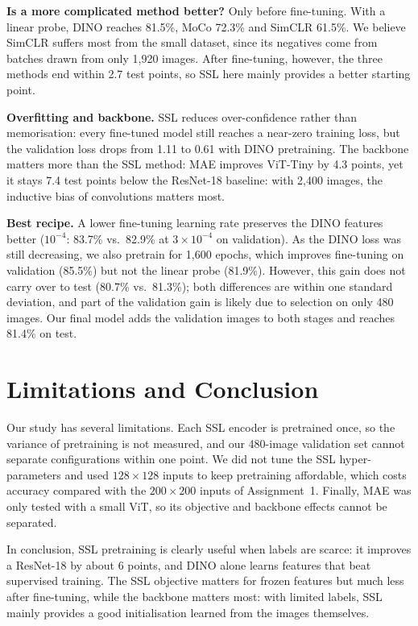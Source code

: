 \documentclass{article}
\begin{document}
\textbf{Is a more complicated method better?} Only before fine-tuning. With a linear probe, DINO reaches 81.5\%, MoCo 72.3\% and SimCLR 61.5\%. We believe SimCLR suffers most from the small dataset, since its negatives come from batches drawn from only 1,920 images. After fine-tuning, however, the three methods end within 2.7 test points, so SSL here mainly provides a better starting point.

\textbf{Overfitting and backbone.} SSL reduces over-confidence rather than memorisation: every fine-tuned model still reaches a near-zero training loss, but the validation loss drops from 1.11 to 0.61 with DINO pretraining. The backbone matters more than the SSL method: MAE improves ViT-Tiny by 4.3 points, yet it stays 7.4 test points below the ResNet-18 baseline: with 2,400 images, the inductive bias of convolutions matters most.

\textbf{Best recipe.} A lower fine-tuning learning rate preserves the DINO features better ($10^{-4}$: 83.7\% vs.\ 82.9\% at $3\times10^{-4}$ on validation). As the DINO loss was still decreasing, we also pretrain for 1,600 epochs, which improves fine-tuning on validation (85.5\%) but not the linear probe (81.9\%). However, this gain does not carry over to test (80.7\% vs.\ 81.3\%); both differences are within one standard deviation, and part of the validation gain is likely due to selection on only 480 images. Our final model adds the validation images to both stages and reaches 81.4\% on test.

\section{Limitations and Conclusion}
\label{sec:conclusion}

Our study has several limitations. Each SSL encoder is pretrained once, so the variance of pretraining is not measured, and our 480-image validation set cannot separate configurations within one point. We did not tune the SSL hyper-parameters and used $128\times128$ inputs to keep pretraining affordable, which costs accuracy compared with the $200\times200$ inputs of Assignment~1. Finally, MAE was only tested with a small ViT, so its objective and backbone effects cannot be separated.

In conclusion, SSL pretraining is clearly useful when labels are scarce: it improves a ResNet-18 by about 6 points, and DINO alone learns features that beat supervised training. The SSL objective matters for frozen features but much less after fine-tuning, while the backbone matters most: with limited labels, SSL mainly provides a good initialisation learned from the images themselves.
\end{document}
